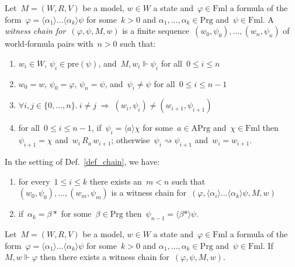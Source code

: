 \documentclass{entcs}
\newcommand{\ximp}{\;\Rightarrow\;}
\newcommand{\pea}[2]{\langle#1\rangle #2}
\newcommand{\prp}[1]{#1*}
\newcommand{\fml}{\mathrm{Fml}}
\newcommand{\prg}{\mathrm{Prg}}
\newcommand{\act}{\mathrm{APrg}}
\newcommand{\psr}[2]{#1 \Vdash #2}
\newcommand{\prel}[3]{#1 \,#2\, #3}
\newcommand{\ppre}[1]{\mathrm{pre}(#1)}
\newcommand{\pzz}{\mathrel{\rightsquigarrow}}
\begin{document}
\begin{definition}
  \label{def_chain}
  Let~$M = (W,R,V)$ be a model, $w \in W$ a state
  and~$\varphi \in \fml$ a formula of the form~$\varphi = \pea{\alpha_1}{\dotsc \pea{\alpha_k}{\psi}}$
  for some~$k > 0$ and $\alpha_1, \dots, \alpha_k \in \prg$ and~$\psi \in \fml$.
  A \emph{witness chain for~$(\varphi, \psi, M, w)$}
  is a finite sequence~$(w_0, \psi_0), \dotsc, (w_n, \psi_n)$
  of world-formula pairs with~$n > 0$ such that:
  \begin{enumerate}
  \item $w_i \in W$, $\psi_i \in \ppre{\psi}$, and~$\psr{M,w_i}{\psi_i}$ for all~$0 \leq i \leq n$
  \item $w_0 = w$, $\psi_0 = \varphi$, $\psi_n = \psi$,
    and~$\psi_i \neq \psi$ for all~$0 \leq i \leq n-1$
  \item $\forall i, j \in \{ 0, \dotsc, n \}.\: i \not= j \ximp (w_i, \psi_i) \not= (w_{i+1}, \psi_{i+1})$
  \item for all~$0 \leq i \leq n-1$,
    if~$\psi_i = \pea{a}{\chi}$ for some~$a \in \act$ and~$\chi \in \fml$
    then~$\psi_{i+1} = \chi$ and~$\prel{w_i}{R_a}{w_{i+1}}$;
    otherwise~$\psi_i \pzz \psi_{i+1}$ and~$w_i = w_{i+1}$.
  \end{enumerate}
\end{definition}
\begin{prop}
  \label{prop_lastelem}
  In the setting of Def.~\ref{def_chain}, we have:
  \begin{enumerate}
  \item for every~$1 \leq i \leq k$ there exists an~$m < n$
    such that~$(w_0, \psi_0), \dotsc, (w_m, \psi_m)$
    is a witness chain for~$(\varphi, \pea{\alpha_i}{\dotsc \pea{\alpha_k}{\psi}}, M, w)$
  \item if~$\alpha_k = \prp{\beta}$ for some~$\beta \in \prg$ then~$\psi_{n-1} = \pea{\prp{\beta}}{\psi}$.
  \end{enumerate}
\end{prop}
\begin{proposition}
  \label{prop_chain}
  Let~$M = (W,R,V)$ be a model, $w \in W$ a state
  and~$\varphi \in \fml$ a formula of the form~$\varphi = \pea{\alpha_1}{\dotsc \pea{\alpha_k}{\psi}}$
  for some~$k > 0$ and $\alpha_1, \dots, \alpha_k \in \prg$ and~$\psi \in \fml$.
  If~$\psr{M,w}{\varphi}$ then there exists a witness chain for~$(\varphi, \psi, M, w)$.
\end{proposition}
\end{document}
